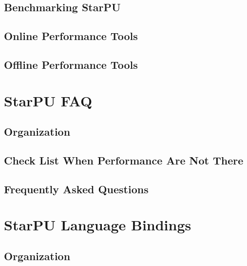\chapter{Benchmarking StarPU}
\label{BenchmarkingStarPU}
\hypertarget{BenchmarkingStarPU}{}


\chapter{Online Performance Tools}
\label{OnlinePerformanceTools}
\hypertarget{OnlinePerformanceTools}{}


\chapter{Offline Performance Tools}
\label{OfflinePerformanceTools}
\hypertarget{OfflinePerformanceTools}{}


\part{StarPU FAQ}

\chapter{Organization}
\label{IntroFAQ}
\hypertarget{IntroFAQ}{}


\chapter{Check List When Performance Are Not There}
\label{CheckListWhenPerformanceAreNotThere}
\hypertarget{CheckListWhenPerformanceAreNotThere}{}


\chapter{Frequently Asked Questions}
\label{FrequentlyAskedQuestions}
\hypertarget{FrequentlyAskedQuestions}{}


\part{StarPU Language Bindings}

\chapter{Organization}
\label{IntroLanguage}
\hypertarget{IntroLanguage}{}



